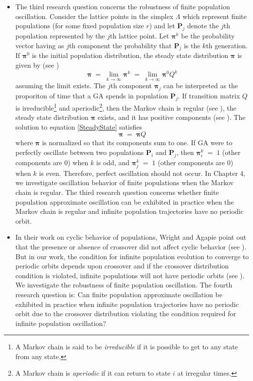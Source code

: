 \begin{itemize}
\item{
The third research question concerns the robustness of finite population oscillation.
Consider the lattice points in the simplex $\Lambda$ which represent finite populations 
(for some fixed population size $r$) 
and let $\bm{P}_j$ denote the $j$th population represented by the $j$th lattice point. 
Let $\bm{\pi}^k$ be the probability vector having as $j$th component 
the probability that $\bm{P}_j$ is the $k$th generation. 
If $\bm{\pi}^0$ is the initial population distribution, 
the steady state distribution $\bm{\pi}$ is given by (see \cite{Haggstrom2002})
\begin{equation}
\label{SteadyState}
\bm{\pi} \;=\; \lim_{k \to \infty} \bm{\pi}^k \;=\; \lim_{k \to \infty} \bm{\pi}^0 Q^k
\end{equation}
assuming the limit exists. The $j$th component $\bm{\pi}_j$ can be interpreted 
as the proporiton of time that a GA spends in population $\bm{P}_j$.
If transition matrix $Q$ is irreducible\footnote{A Markov chain is said to be 
{\em irreducible} if it is possible to get to any state from any state.} 
and aperiodic\footnote{A Markov chain is {\em aperiodic} if it can return to 
state $i$ at irregular times.}, then the Markov chain is 
regular (see \cite{Iosifescu1980}), the steady state distribution $\bm{\pi}$ exists, and it has positive components 
(see \cite{Minc1988}). 
The solution to equation \ref{SteadyState} satisfies
\begin{equation}
\label{SteadyStateSolution}
\bm{\pi} \; = \; \bm{\pi} Q
\end{equation}
where $\bm{\pi}$ is normalized so that its components sum to one.
If GA were to perfectly oscillate between two populations $\bm{P}_i$ and $\bm{P}_j$, then 
$\bm{\pi}^k_i \;=\; 1$ (other components are $0$) when $k$ is odd, 
and $\bm{\pi}^k_j \;=\; 1$ (other components are $0$) when $k$ is even. 
Therefore, perfect oscillation should not occur. In Chapter 4, we investigate oscillation behavior of 
finite populations when the Markov chain is regular. The third research question concerns whether 
finite population approximate oscillation can be exhibited in practice when the Markov chain is regular and 
infinite population trajectories have no periodic orbit.
}

\item{
In their work on cyclic behavior of populations, Wright and Agapie point out that the presence or 
absence of crossover did not affect cyclic behavior (see \cite{Wright2001}). 
But in our work, the condition for infinite population evolution to converge to periodic orbits depends upon crossover 
and if the crossover distribution condition is violated, infinite populations will not have periodic orbits (see \cite{Vose1999}). 
We investigate the robustness of finite population oscillation. 
The fourth research question is: Can finite population approximate oscillation be exhibited in practice when infinite population 
trajectories have no periodic orbit due to the crossover distribution violating the condition 
required for infinite population oscillation? 

}

\end{itemize}


